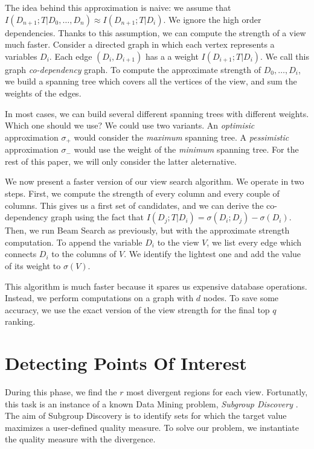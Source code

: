 The idea behind this approximation is naive: we assume that $I(D_{n+1} ; T |
D_0, \ldots, D_{n}) \approx I(D_{n+1} ; T | D_{i})$. We ignore the high order
dependencies. Thanks to this assumption, we can compute the strength of a view
much faster.  Consider a directed graph in which each vertex represents a
variables $D_i$. Each edge $(D_i, D_{i+1})$ has a a weight $ I(D_{i+1} ; T |
D_{i})$.  We call this graph \emph{co-dependency} graph.  To compute the
approximate strength of ${D_0, \ldots, D_i}$, we build a spanning tree which
covers all the vertices of the view, and sum the weights of the edges.

In most cases, we can build several different spanning trees with different
weights. Which one should we use? We could use two variants. An
\emph{optimisic} approximation $\sigma_+ $ would consider the \emph{maximum}
spanning tree.  A \emph{pessimistic} approximation $\sigma_- $ would use the
weight of the \emph{minimum} spanning tree. For the rest of this paper, we will
only consider the latter aleternative. 

We now present a faster version of our view search algorithm.  We operate in
two steps. First, we compute the strength of every column and every couple of
columns.  This gives us a first set of candidates, and we can derive the
co-dependency graph using the fact that $I(D_{j} ; T | D_i) = \sigma(D_i ;
D_{j}) - \sigma(D_i)$.  Then, we run Beam Search as previously, but with the
approximate strength computation.  To append the variable $D_i$ to the view
$V$, we list every edge which connects  $D_i$ to the columns of $V$. We
identify the lightest one and add the value of its weight to $\sigma(V)$.  

This algorithm is much faster because it spares us expensive database
operations. Instead, we perform computations on a graph with $d$ nodes.  To
save some accuracy, we use the exact version of the view strength for the final
top $q$ ranking.

\section{Detecting Points Of Interest}
\label{sec:detec}

During this phase, we find the $r$ most divergent regions for each view.
Fortunatly, this task is an instance of a known Data Mining problem,
\emph{Subgroup Discovery} \cite{klosgen1996explora}\cite{wrobel1997algorithm}.
The aim of Subgroup Discovery is to identify sets for which the target value
maximizes a user-defined quality measure. To solve our problem, we instantiate
the quality measure with the divergence.

